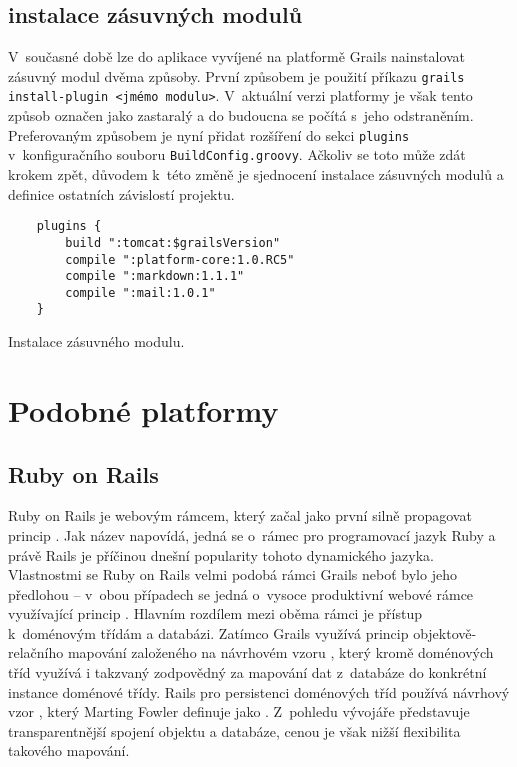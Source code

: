 \subsection{instalace zásuvných modulů}
V~současné době lze do aplikace vyvíjené na platformě Grails nainstalovat zásuvný modul dvěma způsoby. První způsobem je použití příkazu \texttt{grails install-plugin <jmémo modulu>}. V~aktuální verzi platformy je však tento způsob označen jako zastaralý a do budoucna se počítá s~jeho odstraněním. Preferovaným způsobem je nyní přidat rozšíření do sekci \texttt{plugins} v~konfiguračního souboru \texttt{BuildConfig.groovy}. Ačkoliv se toto může zdát krokem zpět, důvodem k~této změně je sjednocení instalace zásuvných modulů a definice ostatních závislostí projektu.
\begin{example}
    \centering
    \begin{lstlisting}
    plugins {
        build ":tomcat:$grailsVersion"
        compile ":platform-core:1.0.RC5"
        compile ":markdown:1.1.1"
        compile ":mail:1.0.1"
    }
    \end{lstlisting}
    \caption{Instalace zásuvného modulu.}
\end{example}

\section{Podobné platformy}

\subsection{Ruby on Rails}
Ruby on Rails je webovým rámcem, který začal jako první silně propagovat princip . Jak název napovídá, jedná se o~rámec pro programovací jazyk Ruby a právě Rails je příčinou dnešní popularity tohoto dynamického jazyka. Vlastnostmi se Ruby on Rails velmi podobá rámci Grails neboť bylo jeho předlohou -- v~obou případech se jedná o~vysoce produktivní webové rámce využívající princip  . Hlavním rozdílem mezi oběma rámci je přístup k~doménovým třídám a databázi. Zatímco Grails využívá princip objektově-relačního mapování založeného na návrhovém vzoru , který kromě doménových tříd využívá i takzvaný  zodpovědný za mapování dat z~databáze do konkrétní instance doménové třídy. Rails pro persistenci doménových tříd používá návrhový vzor , který Marting Fowler definuje jako . Z~pohledu vývojáře představuje  transparentnější spojení objektu a databáze, cenou je však nižší flexibilita takového mapování.

